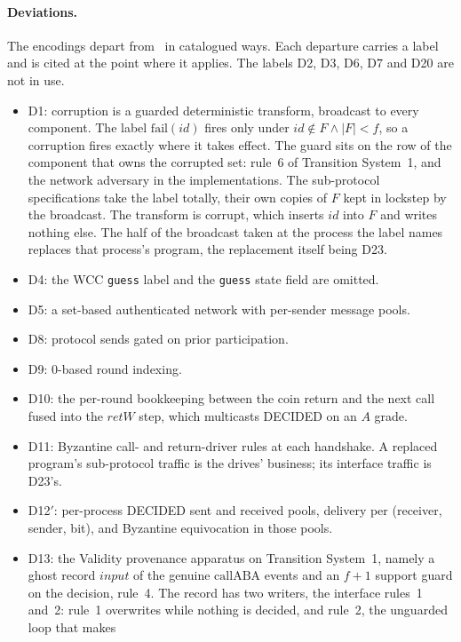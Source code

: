 \paragraph{Deviations.}
The encodings depart from~\cite{LeslieBP} in catalogued ways.
Each departure carries a label and is cited at the point where it applies.
The labels D2, D3, D6, D7 and D20 are not in use.
\begin{itemize}
  \item D1: corruption is a guarded deterministic transform, broadcast to every
    component.
    The label $\mathrm{fail}(id)$ fires only under $id \notin F \wedge |F| < f$,
    so a corruption fires exactly where it takes effect.
    The guard sits on the row of the component that owns the corrupted set:
    rule~6 of Transition System~1, and the network adversary in the
    implementations.
    The sub-protocol specifications take the label totally, their own copies of
    $F$ kept in lockstep by the broadcast.
    The transform is $\mathrm{corrupt}$, which inserts $id$ into $F$ and writes
    nothing else.
    The half of the broadcast taken at the process the label names replaces
    that process's program, the replacement itself being D23.
  \item D4: the WCC \texttt{guess} label and the \texttt{guess} state field are
    omitted.
  \item D5: a set-based authenticated network with per-sender message pools.
  \item D8: protocol sends gated on prior participation.
  \item D9: $0$-based round indexing.
  \item D10: the per-round bookkeeping between the coin return and the next
    call fused into the $retW$ step, which multicasts DECIDED on an $A$ grade.
  \item D11: Byzantine call- and return-driver rules at each handshake.
    A replaced program's sub-protocol traffic is the drives' business; its
    interface traffic is D23's.
  \item D12$'$: per-process DECIDED sent and received pools, delivery per
    (receiver, sender, bit), and Byzantine equivocation in those pools.
  \item D13: the Validity provenance apparatus on Transition System~1, namely a
    ghost record $input$ of the genuine $\mathrm{callABA}$ events and an $f+1$
    support guard on the decision, rule~4.
    The record has two writers, the interface rules~1 and~2: rule~1 overwrites
    while nothing is decided, and rule~2, the unguarded loop that makes

\end{itemize}
